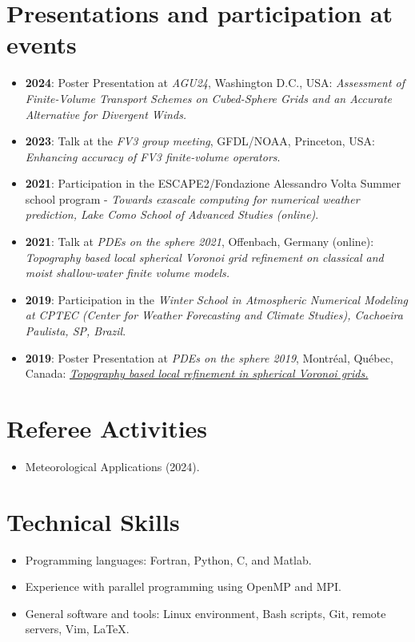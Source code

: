 \documentclass[letterpaper,11pt]{article}
\begin{document}
\section{Presentations and participation at events}
\begin{itemize}
	\item \textbf{2024}: Poster Presentation at \textit{AGU24},  Washington D.C., USA:
    \textit{Assessment of Finite-Volume Transport Schemes on Cubed-Sphere Grids and an Accurate Alternative for Divergent Winds.}
	\item \textbf{2023}: Talk at the \textit{FV3 group meeting}, 
	GFDL/NOAA, Princeton, USA: \textit{Enhancing accuracy of FV3 finite-volume operators}.
	\item \textbf{2021}: Participation in the
    ESCAPE2/Fondazione Alessandro Volta  Summer school program -
    \textit{Towards exascale computing
	for numerical weather prediction, Lake Como School of Advanced Studies (online)}.
	\item \textbf{2021}: Talk at \textit{PDEs on the sphere 2021}, Offenbach, Germany (online): \textit{Topography based local spherical Voronoi grid refinement on classical and moist shallow-water finite volume models.} 
	\item \textbf{2019}: Participation in the \textit{Winter School in Atmospheric Numerical Modeling at CPTEC (Center for Weather Forecasting and Climate Studies), Cachoeira Paulista, SP, Brazil}.
	\item \textbf{2019}: Poster Presentation at \textit{PDEs on the sphere 2019}, Montréal, Québec, Canada:
	\textit{\href{https://collaboration.cmc.ec.gc.ca/science/pdes-2019/pdfs/poster-Luan-Santos.pdf}{Topography based local refinement in spherical Voronoi grids.}}
\end{itemize}

 

\section{Referee Activities}
\begin{itemize}
	\item Meteorological Applications (2024).
\end{itemize}
%
\section{Technical Skills}
\begin{itemize}
	\item Programming languages: Fortran, Python, C, and Matlab.
	\item Experience with parallel programming using OpenMP and MPI.
	\item General software and tools: Linux environment, Bash scripts, Git, remote servers, Vim, \LaTeX.
\end{itemize}
\end{document}
